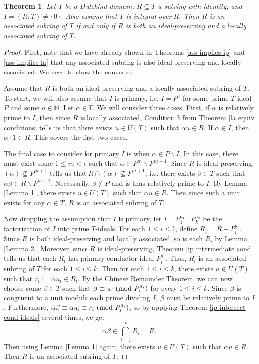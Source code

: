 \documentclass[12pt]{amsart}
\newtheorem{theorem}{Theorem}[section]
\theoremstyle{definition}
\newcommand{\bN}{\mathbb N}
\newcommand{\modulo}[1]{\textup{ (mod }#1)}
\begin{document}
	\begin{theorem}
		\label{ass iff ip and la}
		Let $T$ be a Dedekind domain, $R\subseteq T$ a subring with identity, and $I=(R:T)\neq\{0\}$. Also assume that $T$ is integral over $R$. Then $R$ is an associated subring of $T$ if and only if $R$ is both an ideal-preserving and a locally associated subring of $T$.
	\end{theorem}
	
	\begin{proof}
		First, note that we have already shown in Theorems \ref{ass implies ip} and \ref{ass implies la} that any associated subring is also ideal-preserving and locally associated. We need to show the converse.
		
		Assume that $R$ is both an ideal-preserving and a locally associated subring of $T$.  To start, we will also assume that $I$ is primary, i.e. $I=P^a$ for some prime $T$-ideal $P$ and some $a\in\bN$. Let $\alpha\in T$. We will consider three cases. First, if $\alpha$ is relatively prime to $I$, then since $R$ is locally associated, Condition 3 from Theorem \ref{la equiv conditions} tells us that there exists $u\in U(T)$ such that $\alpha u\in R$. If $\alpha\in I$, then $\alpha\cdot 1\in R$. This covers the first two cases.
		
		The final case to consider for primary $I$ is when $\alpha\in P\backslash I$. In this case, there must exist some $1\leq m<a$ such that $\alpha\in P^m\backslash P^{m+1}$. Since $R$ is ideal-preserving, $(\alpha)\nsubseteq P^{m+1}$ tells us that $R\cap (\alpha)\nsubseteq P^{m+1}$, i.e. there exists $\beta\in T$ such that $\alpha\beta\in R\backslash P^{m+1}$. Necessarily, $\beta\notin P$ and is thus relatively prime to $I$. By Lemma \ref{Lemma 1}, there exists $u\in U(T)$ such that $\alpha u\in R$. Then since such a unit exists for any $\alpha\in T$, $R$ is an associated subring of $T$.
		
		Now dropping the assumption that $I$ is primary, let $I=P_1^{a_1}\dots P_k^{a_k}$ be the factorization of $I$ into prime $T$-ideals. For each $1\leq i\leq k$, define $R_i=R+P_i^{a_i}$. Since $R$ is both ideal-preserving and locally associated, so is each $R_i$ by Lemma \ref{Lemma 2}. Moreover, since $R$ is ideal-preserving, Theorem \ref{ip intermediate cond} tells us that each $R_i$ has primary conductor ideal $P_i^{a_i}$. Thus, $R_i$ is an associated subring of $T$ for each $1\leq i\leq k$. Then for each $1\leq i\leq k$, there exists $u\in U(T)$ such that $r_i:=\alpha u_i\in R_i$. By the Chinese Remainder Theorem, we can now choose some $\beta\in T$ such that $\beta\equiv u_i\modulo{P_i^{a_i}}$ for every $1\leq i\leq k$. Since $\beta$ is congruent to a unit modulo each prime dividing $I$, $\beta$ must be relatively prime to $I$. Furthermore, $\alpha\beta\equiv \alpha u_i\equiv r_i\modulo{P_i^{a_i}}$, so by applying Theorem \ref{ip intersect cond ideals} several times, we get $$\alpha\beta\in \bigcap_{i=1}^{k}R_i=R.$$ Then using Lemma \ref{Lemma 1} again, there exists $u\in U(T)$ such that $\alpha u\in R$. Then $R$ is an associated subring of $T$.
	\end{proof}
	
\end{document}
